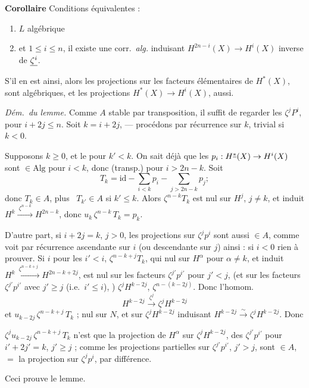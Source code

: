 \documentclass[11pt,a4paper]{article}
\begin{document}
\marginal{(\ill{})}

\textbf{Corollaire} Conditions équivalentes :

\begin{enumerate}
\item[(i)] $L$ algébrique
\item[(ii)] \ill{} et $1 \leq i \leq n$, il existe une corr.\ \emph{alg.}
induisant $H^{2n-i}(X) \to H^{i}(X)$ inverse de $\uncertain{\zeta^{i}}$.
\end{enumerate}

 S'il en est ainsi, alors \ill{} les projections sur les facteurs
élémentaires de $H^{*}(X)$, sont algébriques, et les projections
$H^{*}(X) \to H^{i}(X)$, aussi.

\emph{Dém.\ du lemme.} Comme $A$ stable par transposition, il suffit de regarder
les $\zeta^{j}P^{i}$, pour $i + 2j \leq n$. Soit $k = i + 2j$, --- procédons par
récurrence sur $k$, trivial si $k < 0$.


Supposons $k \geq 0$, et le \ill{} \ill{} pour $k' < k$. On sait déjà que les
$p_{i} : H^{\uncertain{*}}(X) \to H^{i}(X)$ sont $\in \mathrm{Alg}$ pour
$i < k$, donc (transp.) pour $i > 2n-k$. Soit
\[
  T_{k} = \mathrm{id} - \sum_{i<k} p_{i} - \sum_{j>2n-k} p_{j} ;
\]
donc $T_{k} \in A$, plus \ $T_{k'} \in A$ si $k' \leq k$. Alors
$\zeta^{n-k}T_{k}$ est nul sur $H^{j}$, $j \neq k$, et induit
$H^{k} \xrightarrow{\ \zeta^{n-k}\ } H^{2n-k}$, donc
$u_{k}\,\zeta^{n-k}\,T_{k} = p_{k}$.

D'autre part, si $i + 2j = k$, $j > 0$, les projections sur $\zeta^{j}p^{i}$
sont aussi $\in A$, comme \ill{} voit  par récurrence
ascendante sur $i$ (ou descendante sur $j$) ainsi : si $i < 0$ rien à prouver.
Si $i$ \ill{} \struck{\ill{}} pour les $i' < i$, \ill{} $\zeta^{n-k+j}T_{k}$,
\struck{\ill{}} qui \ill{} nul sur $H^{\alpha}$ pour $\alpha \neq k$, et induit
$H^{k} \xrightarrow{\ \zeta^{n-k+j}\ } H^{2n-k+2j}$, \ill{} est nul sur les
facteurs $\zeta^{j'}p^{i'}$ pour $j' < j$, (et sur les facteurs
$\zeta^{j'}p^{i'}$ avec $j' \geq j$ (i.e.\ $i' \leq i$), ) \ill{} $\zeta^{j}H^{k-2j}$, \ill{} $\zeta^{n-(k-2j)}$. Donc l'homom.
\[
  H^{k-2j} \xrightarrow{\ \zeta^{j}\ } \zeta^{j}H^{k-2j}
\]
et $u_{k-2j}\,\zeta^{n-k+j}\,T_{k}$ \ill{} ; nul sur $N$, et sur
$\zeta^{j}H^{k-2j}$ \ill{} induisant $H^{k-2j} \xrightarrow{\ \sim\ }
\zeta^{j}H^{k-2j}$. Donc \ill{}


$\zeta^{j}u_{k-2j}\,\zeta^{n-k+j}\,T_{k}$ n'est  que la
projection de $H^{\alpha}$ sur $\zeta^{j}H^{k-2j}$, \ill{} des
$\zeta^{j'}p^{i'}$ pour $i' + 2j' = k$, $j' \geq j$ ;  comme \ill{}
les projections  partielles sur $\zeta^{j'}p^{i'}$, $j' > j$, sont
$\in A$, \ill{} \ill{} \ill{} $=$ \ill{} la projection sur $\zeta^{j}p^{i}$, par
différence.

Ceci prouve le lemme.
\end{document}
